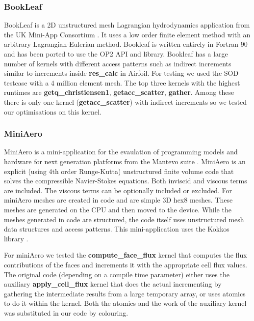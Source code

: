 \subsubsection{BookLeaf}
BookLeaf is a 2D unstructured mesh Lagrangian hydrodynamics application from the
UK Mini-App Consortium \cite{uk-mac}. It uses a low order finite element method
with an arbitrary Lagrangian-Eulerian method.  Bookleaf is written entirely in
Fortran 90 and has been ported to use the OP2 API and library. Bookleaf has a
large number of kernels with different access patterns such as indirect
increments similar to increments inside \textbf{res\_calc} in Airfoil. For
testing we used the SOD testcase with a 4 million element mesh. The top three
kernels with the highest runtimes are \textbf{getq\_christiensen1},
\textbf{getacc\_scatter}, \textbf{gather}. Among these there is only
one kernel (\textbf{getacc\_scatter}) with indirect increments so we tested our
optimisations on this kernel.

\subsubsection{MiniAero}\label{sec:mini-aero-summary}
MiniAero \cite{miniaero} is a mini-application for the evaulation of programming
models and hardware for next generation platforms from the Mantevo suite
\cite{heroux2009improving}. MiniAero is an explicit (using 4th order
Runge-Kutta) unstructured finite volume code that solves the compressible
Navier-Stokes equations. Both inviscid and viscous terms are included. The
viscous terms can be optionally included or excluded. For miniAero meshes are
created in code and are simple 3D hex8 meshes. These meshes are generated on the
CPU and then moved to the device. While the meshes generated in code are
structured, the code itself uses unstructured mesh data structures and access
patterns. This mini-application uses the Kokkos library
\cite{CarterEdwards20143202}.

For miniAero we tested the \textbf{compute\_face\_flux} kernel that computes the
flux contributions of the faces and increments it with the appropriate cell flux
values. The original code (depending on a compile time parameter) either uses
the auxiliary \textbf{apply\_cell\_flux} kernel that does the actual
incrementing by gathering the intermediate results from a large temporary array,
or uses atomics to do it within the kernel. Both the atomics and the work of the
auxiliary kernel was substituted in our code by colouring.


